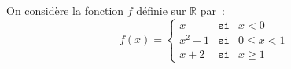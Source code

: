 

On considère la fonction  $ f $ définie sur $  \mathbb{R} $ par~:
\newpar
\[ f(x) =  \left\{ \begin{matrix}  x  & \texttt{si} & x < 0\\  x^2  - 1 &\texttt{si} & 0 
 \leqslant x<1 \\  x+2 & \texttt{si} & x \geqslant 1   \end{matrix} \right.\]

